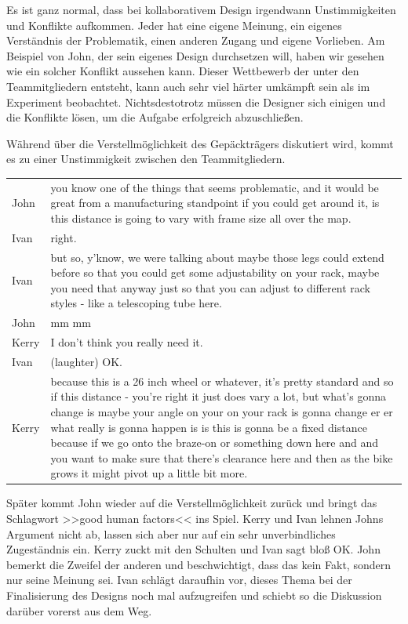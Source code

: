 Es ist ganz normal, dass bei kollaborativem Design irgendwann Unstimmigkeiten und Konflikte aufkommen. Jeder hat eine eigene Meinung, ein eigenes Verständnis der Problematik, einen anderen Zugang und eigene Vorlieben. Am Beispiel von John, der sein eigenes Design durchsetzen will, haben wir gesehen wie ein solcher Konflikt aussehen kann. Dieser Wettbewerb der unter den Teammitgliedern entsteht, kann auch sehr viel härter umkämpft sein als im Experiment beobachtet. Nichtsdestotrotz müssen die Designer sich einigen und die Konflikte lösen, um die Aufgabe erfolgreich abzuschließen.

\medskip Während über die Verstellmöglichkeit des Gepäckträgers diskutiert wird, kommt es zu einer Unstimmigkeit zwischen den Teammitgliedern.

\begin{extract}[Das Team ist sich nicht einig.]
	{
		\myfloatalign
		\begin{tabularx}{\textwidth}{p{1cm}X}
    		John & you know one of the things that seems problematic, and it would be great from a manufacturing standpoint if you could get around it, is this distance is going to vary with frame size all over the map.\\
			Ivan & right.\\
			Ivan & but so, y'know, we were talking about maybe those legs could extend before so that you could get some adjustability on your rack, maybe you need that anyway just so that you can adjust to different rack styles - like a telescoping tube here.\\
			John & mm mm \\
			Kerry & I don't think you really need it. \\
			Ivan & (laughter) OK.\\
			Kerry & because this is a 26 inch wheel or whatever, it's pretty standard and so if this distance - you're right it just does vary a lot, but what's gonna change is maybe your angle on your on your rack is gonna change er er what really is gonna happen is is this is gonna be a fixed distance because if we go onto the braze-on or something down here and and you want to make sure that there's clearance here and then as the bike grows it might pivot up a little bit more.
		\end{tabularx}
	}
\end{extract}

Später kommt John wieder auf die Verstellmöglichkeit zurück und bringt das Schlagwort >>good human factors<< ins Spiel. Kerry und Ivan lehnen Johns Argument nicht ab, lassen sich aber nur auf ein sehr unverbindliches Zugeständnis ein. Kerry zuckt mit den Schulten und Ivan sagt bloß OK. John bemerkt die Zweifel der anderen und beschwichtigt, dass das kein Fakt, sondern nur seine Meinung sei. Ivan schlägt daraufhin vor, dieses Thema bei der Finalisierung des Designs noch mal aufzugreifen und schiebt so die Diskussion darüber vorerst aus dem Weg.

